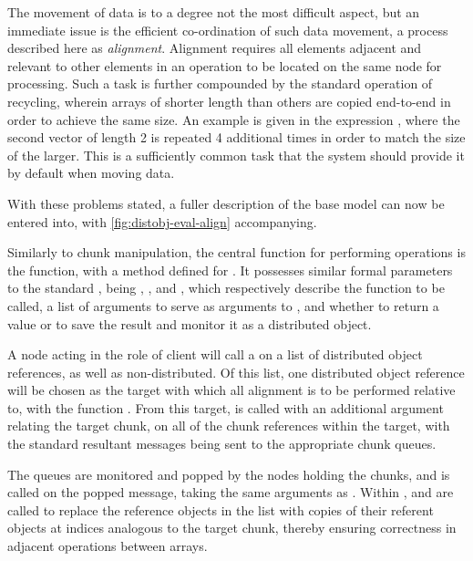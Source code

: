 The movement of data is to a degree not the most difficult aspect, but an immediate issue is the efficient co-ordination of such data movement, a process described here as \textit{alignment}.
Alignment requires all elements adjacent and relevant to other elements in an operation to be located on the same node for processing.
Such a task is further compounded by the standard operation of recycling, wherein arrays of shorter length than others are copied end-to-end in order to achieve the same size.
An example is given in the expression , where the second vector of length 2 is repeated 4 additional times in order to match the size of the larger.
This is a sufficiently common task that the system should provide it by default when moving data.

With these problems stated, a fuller description of the base model can now be entered into, with \cref{fig:distobj-eval-align} accompanying.


Similarly to chunk manipulation, the central function for performing operations is the  function, with a method defined for .
It possesses similar formal parameters to the standard , being , , and , which respectively describe the function to be called, a list of arguments to serve as arguments to , and whether to return a value or to save the result and monitor it as a distributed object.

A node acting in the role of client will call a  on a list of distributed object references, as well as non-distributed.
Of this list, one distributed object reference will be chosen as the target with which all alignment is to be performed relative to, with the function .
From this target,  is called with an additional  argument relating the target chunk, on all of the chunk references within the target, with the standard resultant messages being sent to the appropriate chunk queues.

The queues are monitored and popped by the nodes holding the chunks, and  is called on the popped message, taking the same arguments as .
Within ,  and  are called to replace the reference objects in the  list with copies of their referent objects at indices analogous to the target chunk, thereby ensuring correctness in adjacent operations between arrays.

